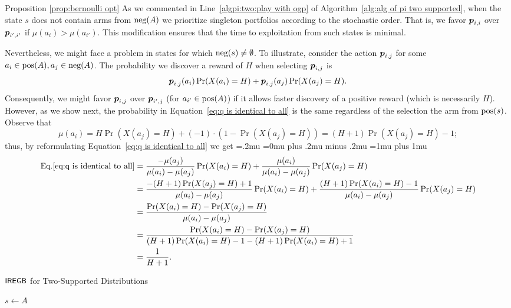 \begin{proofof}{Proposition \ref{prop:bernoulli opt}}
As we commented in Line~\ref{algpi:two:play with ogp} of Algorithm~\ref{alg:alg of pi two supported}, when the state $s$ does not contain arms from $\textnormal{neg}(A)$ we prioritize singleton portfolios according to the stochastic order. That is, we favor $\boldsymbol{ p }_{i,i}$ over $\boldsymbol{ p }_{i',i'}$ if $\mu(a_i) > \mu(a_{i'})$. This modification ensures that the time to exploitation from such states is minimal. 

Nevertheless, we might face a problem in states for which $\textnormal{neg}(s)\neq\emptyset$. To illustrate, consider the action $\boldsymbol{ p }_{i,j}$ for some $a_i\in \textnormal{pos}(A), a_j\in \textnormal{neg}(A)$. The probability we discover a reward of $H$ when selecting $\boldsymbol{ p }_{i,j}$ is
\begin{align}\label{eq:q is identical to all}
\boldsymbol{ p }_{i,j}(a_i)\Pr(X(a_i)=H)  + \boldsymbol{ p }_{i,j}(a_j)\Pr(X(a_j)=H).
\end{align}
Consequently, we might favor $\boldsymbol{ p }_{i,j}$ over $\boldsymbol{ p }_{i',j}$ (for $a_{i'}\in \textnormal{pos}(A)$) if it allows faster discovery of a positive reward (which is necessarily $H$). However, as we show next, the probability in Equation~\eqref{eq:q is identical to all} is the same regardless of the selection the arm from $\textnormal{pos}(s)$. Observe that 
\[
\mu(a_i) = H\Pr(X(a_j)=H) +(-1)\cdot (1-\Pr(X(a_j)=H)) = (H+1)\Pr(X(a_j)=H)-1; 
\]
thus, by reformulating Equation~\eqref{eq:q is identical to all} we get
{
\thinmuskip=.2mu
\medmuskip=0mu plus .2mu minus .2mu
\thickmuskip=1mu plus 1mu
\begin{align*}\label{eq:q is identical to all elaborate}
\textnormal{Eq.}\eqref{eq:q is identical to all}&=\frac{-\mu(a_j)}{\mu(a_i)-\mu(a_j)}\Pr(X(a_i)=H)+ \frac{\mu(a_i)}{\mu(a_i)-\mu(a_j)}\Pr(X(a_j)=H)\\
& =\frac{-(H+1)\Pr(X(a_j)=H)+1}{\mu(a_i)-\mu(a_j)}\Pr(X(a_i)=H)+ \frac{(H+1)\Pr(X(a_i)=H)-1}{\mu(a_i)-\mu(a_j)}\Pr(X(a_j)=H)\\
& = \frac{\Pr(X(a_i)=H)-\Pr(X(a_j)=H)}{\mu(a_i)-\mu(a_j)}\\
& = \frac{\Pr(X(a_i)=H)-\Pr(X(a_j)=H)}{(H+1)\Pr(X(a_i)=H)-1-(H+1)\Pr(X(a_i)=H)+1}\\
& = \frac{1}{H+1}.
\end{align*}
}%

\begin{algorithm}[t]
\LinesNumbered
\SetNoFillComment
\DontPrintSemicolon
\caption{${\small\textnormal{\textsf{IREGB}}}$ for Two-Supported Distributions \label{alg:alg of pi two supported}}
$s \gets A$\; %
\end{algorithm}



\end{proofof}
